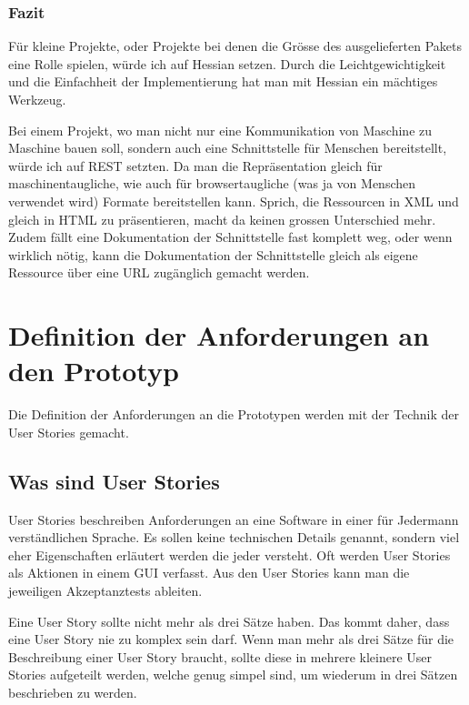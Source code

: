 \documentclass[abstracton, listof=totocnumbered,
bibliography=totocnumbered]{scrreprt}
\begin{document}
  \subsection{Fazit}
  
  Für kleine Projekte, oder Projekte bei denen die Grösse des ausgelieferten Pakets
  eine Rolle spielen, würde ich auf Hessian setzen. Durch die
  Leichtgewichtigkeit und die Einfachheit der Implementierung hat man mit
  Hessian ein mächtiges Werkzeug.
  
  Bei einem Projekt, wo man nicht nur eine Kommunikation von Maschine zu
  Maschine bauen soll, sondern auch eine Schnittstelle für Menschen
  bereitstellt, würde ich auf \ac{REST} setzten. Da man die Repräsentation
  gleich für maschinentaugliche, wie auch für browsertaugliche (was ja von
  Menschen verwendet wird) Formate bereitstellen kann. Sprich, die Ressourcen in
  \ac{XML} und gleich in \ac{HTML} zu präsentieren, macht da keinen grossen
  Unterschied mehr. Zudem fällt eine Dokumentation der Schnittstelle fast
  komplett weg, oder wenn wirklich nötig, kann die Dokumentation der
  Schnittstelle gleich als eigene Ressource über eine \ac{URL} zugänglich
  gemacht werden.
  
  \newpage
  
  \chapter{Definition der Anforderungen an den Prototyp}
  
  Die Definition der Anforderungen an die Prototypen werden mit der Technik der
  User Sto\-ries\cite{UserStories} gemacht.
  
  \section{Was sind User Stories}
  
  User Stories beschreiben Anforderungen an eine Software in einer für Jedermann
  verständlichen Sprache. Es sollen keine technischen Details genannt, sondern
  viel eher Eigenschaften erläutert werden die jeder versteht. Oft werden User
  Stories als Aktionen in einem \ac{GUI} verfasst. Aus den User Stories kann
  man die jeweiligen Akzeptanztests\cite{AcceptanceTests} ableiten.
  
  Eine User Story sollte nicht mehr als drei Sätze haben. Das kommt daher, dass
  eine User Story nie zu komplex sein darf. Wenn man mehr als drei Sätze für die
  Beschreibung einer User Story braucht, sollte diese in mehrere kleinere User
  Stories aufgeteilt werden, welche genug simpel sind, um wiederum in drei
  Sätzen beschrieben zu werden.
  
\end{document}
